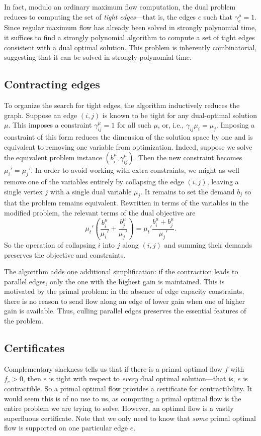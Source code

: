 \documentclass[11pt]{article}
\theoremstyle{definition}
\theoremstyle{definition}
\newcommand{\biu}{b_{i}^{\mu}}
\newcommand{\gij}{\gamma_{ij}}
\newcommand{\geu}{\gamma_e^{\mu}}
\newcommand{\giij}{\gamma_{ij}^{\mu}}
\begin{document}
    In fact, modulo an ordinary maximum flow computation, the dual problem reduces to computing
    the set of \emph{tight edges}---that is, the edges $e$ such that $\geu = 1$. Since regular maximum
    flow has already been solved in strongly polynomial time, it suffices to find a strongly polynomial
    algorithm to compute a set of tight edges consistent with a dual optimal solution. This problem
    is inherently combinatorial, suggesting that it can be solved in strongly polynomial time.
    
    \subsection{Contracting edges}
    To organize the search for tight edges, the algorithm inductively reduces the graph.
    Suppose an edge $(i, j)$ is known to be tight for any dual-optimal solution $\mu$. This
    imposes a constraint $\giij = 1$ for all such $\mu$, or, i.e., $\gij \mu_i = \mu_j$.
    Imposing a constraint of this form reduces the dimension of the solution
    space by one and is equivalent to removing one variable from optimization. Indeed,
    suppose we solve the equivalent problem instance $(\biu, \giij)$. Then the new constraint
    becomes $\mu_i' = \mu_j'$. In order to avoid working with extra constraints, we might
    as well remove one of the variables entirely by collapsing the edge $(i, j)$, leaving a single
    vertex $j$ with a single dual variable $\mu_j$. It remains to set the demand $b_j$ so
    that the problem remains equivalent. Rewritten in terms of the variables in
    the modified problem, the relevant terms of the dual objective are
    \[ \mu_t' \left(\frac{b_i^\mu}{\mu_i'} + \frac{b_j^\mu}{\mu_j'}\right)
     = \mu_t' \frac{b_i^\mu + b_j^\mu}{\mu_j'}. \]
	So the operation of collapsing $i$ into $j$ along $(i, j)$ and summing their demands
	preserves the objective and constraints.
	
	The algorithm adds one additional simplification: if the contraction leads to parallel edges,
	only the one with the highest gain is maintained. This is motivated by the primal problem: in
	the absence of edge capacity constraints, there is no reason to send flow along an edge of
	lower gain when one of higher gain is available. Thus, culling parallel edges preserves the
	essential features of the problem.
	
	\subsection{Certificates}
	Complementary slackness tells us that if there is a primal optimal flow $f$ with
	$f_e > 0$, then $e$ is tight with respect to \emph{every} dual optimal solution---that
	is, $e$ is contractible. So a primal optimal flow provides a certificate for contractibility.
	It would seem this is of no use to us, as computing a primal optimal flow is the entire
	problem we are trying to solve. However, an optimal flow is a vastly superfluous certificate.
	Note that we only need to know that \emph{some}
	primal optimal flow is supported on one particular edge $e$.
	
\end{document}

